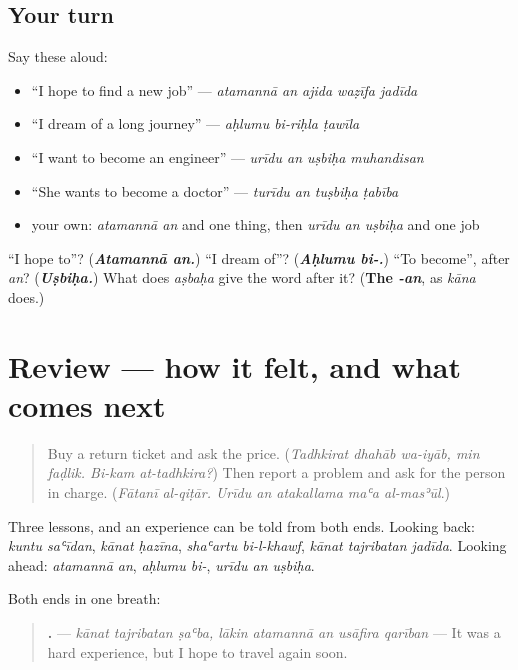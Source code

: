 \subsection*{Your turn}
Say these aloud:

\begin{itemize}
\raggedright
  \item \textquotedblleft{}I hope to find a new job\textquotedblright{} — \emph{atamannā an ajida waẓīfa jadīda}
  \item \textquotedblleft{}I dream of a long journey\textquotedblright{} — \emph{aḥlumu bi-riḥla ṭawīla}
  \item \textquotedblleft{}I want to become an engineer\textquotedblright{} — \emph{urīdu an uṣbiḥa muhandisan}
  \item \textquotedblleft{}She wants to become a doctor\textquotedblright{} — \emph{turīdu an tuṣbiḥa ṭabība}
  \item your own: \emph{atamannā an} and one thing, then \emph{urīdu an uṣbiḥa} and one job
\end{itemize}

\begin{tcolorbox}[breakable,colback=teal!4,colframe=teal!35!black,title={Before you move on}]
\textquotedblleft{}I hope to\textquotedblright{}? (\emph{\textbf{Atamannā an.}}) \textquotedblleft{}I dream of\textquotedblright{}? (\emph{\textbf{Aḥlumu bi-.}}) \textquotedblleft{}To become\textquotedblright{}, after \emph{an}? (\emph{\textbf{Uṣbiḥa.}}) What does \emph{aṣbaḥa} give the word after it? (\textbf{The \emph{-an}}, as \emph{kāna} does.)
\end{tcolorbox}
\section[(review)]{Review — how it felt, and what comes next}

\label{lesson:AR-R289-feelings-and-hopes}



\begin{quote}
Buy a return ticket and ask the price. (\emph{Tadhkirat dhahāb wa-iyāb, min faḍlik. Bi-kam at-tadhkira?}) Then report a problem and ask for the person in charge. (\emph{Fātanī al-qiṭār. Urīdu an atakallama maʿa al-masʾūl}.)
\end{quote}

\begin{grammarlens}[title={What you've built}]
Three lessons, and an experience can be told from both ends. Looking back: \emph{kuntu saʿīdan}, \emph{kānat ḥazīna}, \emph{shaʿartu bi-l-khawf}, \emph{kānat tajribatan jadīda}. Looking ahead: \emph{atamannā an}, \emph{aḥlumu bi-}, \emph{urīdu an uṣbiḥa}.

Both ends in one breath:

\begin{quote}
\textbf{       .} — \emph{kānat tajribatan ṣaʿba, lākin atamannā an usāfira qarīban} — It was a hard experience, but I hope to travel again soon.
\end{quote}
\end{grammarlens}

